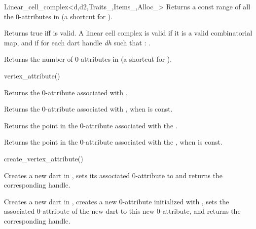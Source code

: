 \begin{ccRefClass}{Linear_cell_complex<d,d2,Traits_,Items_,Alloc_>}
{Returns a const range of all the 0-attributes in 
      (a shortcut for ).}


         {Returns true iff  is valid.}
A linear cell complex  is valid  
if it is a valid combinatorial map, and if for each dart handle \emph{dh} such that 
\myin{}: .


{Returns the number of 0-attributes in 
       (a shortcut for ).}
 
{vertex_attribute()}{}

{Returns the 0-attribute associated with .
}

{Returns the 0-attribute associated with , when  is const.
}

{Returns the point in the 0-attribute associated with the .
}

{Returns the point in the 0-attribute associated with the , 
  when  is const.
}

{create_vertex_attribute()}{}

   {Creates a new dart in , sets its associated 0-attribute
     to  and returns the corresponding handle.
   }

{Creates a new dart in , creates a new 0-attribute 
  initialized with , sets the associated 0-attribute
  of the new dart to this new 0-attribute, 
  and returns the corresponding handle.}


\end{ccRefClass}
